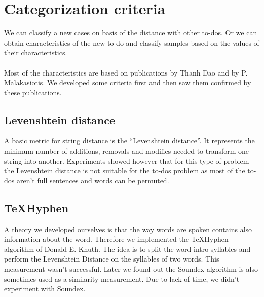 \documentclass[a4paper,titlepage]{article}
\begin{document}
\section{Categorization criteria}
We can classify a new cases on basis of the distance with other to-dos. Or we can obtain characteristics of the new to-do and classify samples based on the values of their characteristics.
\paragraph{}
Most of the characteristics are based on publications \cite{codeproject2,codeproject1} by Thanh Dao and \cite{Malakasiotis:2007:LTE:1654536.1654547} by P. Malakasiotis. We developed some criteria first and then saw them confirmed by these publications.
\subsection{Levenshtein distance}
A basic metric for string distance is the ``Levenshtein distance''. It represents the minimum number of additions, removals and modifies needed to transform one string into another. Experiments showed however that for this type of problem the Levenshtein distance is not suitable for the to-dos problem as most of the to-dos aren't full sentences and words can be permuted.
\subsection{TeXHyphen}
A theory we developed ourselves is that the way words are spoken contains also information about the word. Therefore we implemented the TeXHyphen algorithm\cite[p.376-406]{knuth1986tex} of Donald E. Knuth. The idea is to split the word intro syllables and perform the Levenshtein Distance on the syllables of two words. This measurement wasn't successful. Later we found out the Soundex algorithm is also sometimes used as a similarity measurement. Due to lack of time, we didn't experiment with Soundex.
\end{document}
